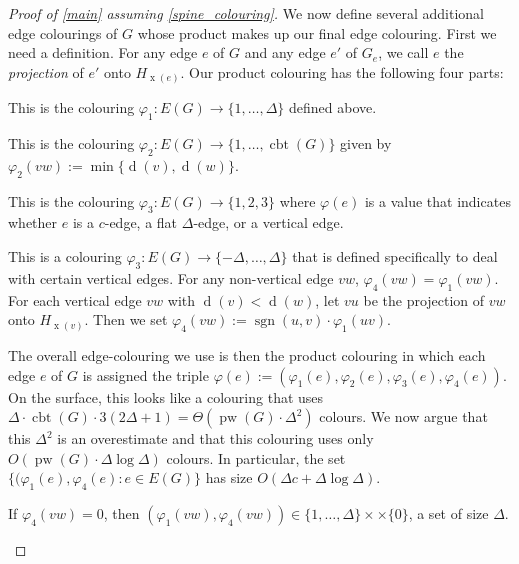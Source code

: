 \documentclass[kpfonts]{patmorin}
\DeclareMathOperator{\pw}{pw}
\DeclareMathOperator{\x}{x}
\DeclareMathOperator{\depth}{d}
\DeclareMathOperator{\cbt}{cbt}
\DeclareMathOperator{\sgn}{sgn}
\begin{document}
\begin{proof}[Proof of \cref{main} assuming \cref{spine_colouring}]
    We now define several additional edge colourings of $G$ whose product makes up our final edge colouring. First we need a definition.  For any edge $e$ of $G$ and any edge $e'$ of $G_e$, we call $e$ the \emph{projection} of $e'$ onto $H_{\x(e)}$.  Our product colouring has the following four parts:
    \begin{compactenum}[$\varphi_1$:]
        \item This is the colouring $\varphi_1:E(G)\to\{1,\ldots,\Delta\}$ defined above.
        \item This is the colouring $\varphi_2:E(G)\to\{1,\ldots,\cbt(G)\}$ given by $\varphi_2(vw):=\min\{\depth(v),\depth(w)\}$.
        \item This is the colouring $\varphi_3:E(G)\to\{1,2,3\}$ where $\varphi(e)$ is a value that indicates whether $e$ is a $c$-edge, a flat $\Delta$-edge, or a vertical edge.
        \item This is a colouring $\varphi_3:E(G)\to\{-\Delta,\ldots,\Delta\}$ that is defined specifically to deal with certain vertical edges. For any non-vertical edge $vw$, $\varphi_4(vw)=\varphi_1(vw)$.
        For each vertical edge $vw$ with $\depth(v)<\depth(w)$, let $vu$ be the projection of $vw$ onto $H_{\x(v)}$. Then we set  $\varphi_4(vw):=\sgn(u,v)\cdot\varphi_1(uv)$.
    \end{compactenum}
    The overall edge-colouring we use is then the product colouring in which each edge $e$ of $G$ is assigned the triple $\varphi(e):=(\varphi_1(e),\varphi_2(e),\varphi_3(e),\varphi_4(e))$.  On the surface, this looks like a colouring that uses $\Delta\cdot \cbt(G)\cdot 3(2\Delta+1)=\Theta(\pw(G)\cdot\Delta^2)$ colours.  We now argue that this $\Delta^2$ is an overestimate and that this colouring uses only $O(\pw(G)\cdot\Delta\log\Delta)$ colours.  In particular, the set $\{(\varphi_1(e),\varphi_4(e):e\in E(G)\}$ has size $O(\Delta c + \Delta\log\Delta)$.

    \begin{compactenum}
        \item If $\varphi_4(vw)=0$, then $(\varphi_1(vw),\varphi_4(vw))\in\{1,\ldots,\Delta\}\times\times\{0\}$, a set of size $\Delta$.


\end{compactenum}
\end{proof}
\end{document}
